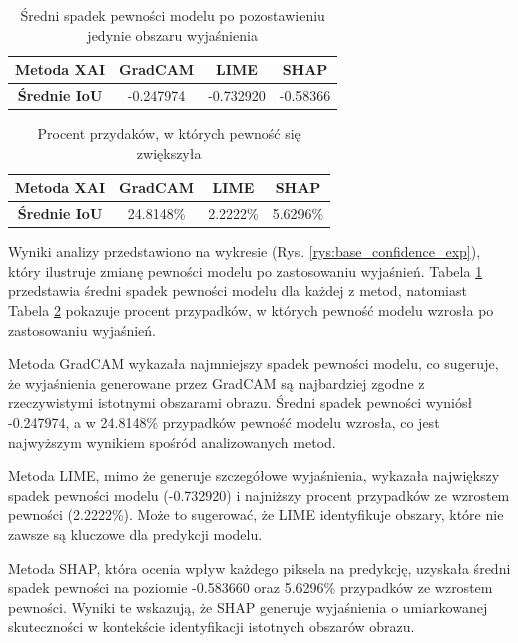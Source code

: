 \begin{table}
	\centering
	\begin{tabular}{|c|c|c|c|}
		\hline
		\textbf{Metoda XAI}  & GradCAM   & LIME      & SHAP     \\
		\hline
		\textbf{Średnie IoU} & -0.247974 & -0.732920 & -0.58366 \\
		\hline
	\end{tabular}
	\caption{Średni spadek pewności modelu po pozostawieniu jedynie obszaru wyjaśnienia}
	\label{tab:base_confidence_exp}
\end{table}

\begin{table}
	\centering
	\begin{tabular}{|c|c|c|c|}
		\hline
		\textbf{Metoda XAI}  & GradCAM   & LIME     & SHAP     \\
		\hline
		\textbf{Średnie IoU} & 24.8148\% & 2.2222\% & 5.6296\% \\
		\hline
	\end{tabular}
	\caption{Procent przydaków, w których pewność się zwiększyła}
	\label{tab:base_confidence_exp_percent}
\end{table}

Wyniki analizy przedstawiono na wykresie (Rys. \ref{rys:base_confidence_exp}), który ilustruje zmianę pewności modelu po zastosowaniu wyjaśnień.
Tabela \ref{tab:base_confidence_exp} przedstawia średni spadek pewności modelu dla każdej z metod, natomiast Tabela \ref{tab:base_confidence_exp_percent} pokazuje procent przypadków, w których pewność modelu wzrosła po zastosowaniu wyjaśnień.

Metoda GradCAM wykazała najmniejszy spadek pewności modelu, co sugeruje, że wyjaśnienia generowane przez GradCAM są najbardziej zgodne z rzeczywistymi istotnymi obszarami obrazu.
Średni spadek pewności wyniósł -0.247974, a w 24.8148\% przypadków pewność modelu wzrosła, co jest najwyższym wynikiem spośród analizowanych metod.

Metoda LIME, mimo że generuje szczegółowe wyjaśnienia, wykazała największy spadek pewności modelu (-0.732920) i najniższy procent przypadków ze wzrostem pewności (2.2222\%).
Może to sugerować, że LIME identyfikuje obszary, które nie zawsze są kluczowe dla predykcji modelu.

Metoda SHAP, która ocenia wpływ każdego piksela na predykcję, uzyskała średni spadek pewności na poziomie -0.583660 oraz 5.6296\% przypadków ze wzrostem pewności.
Wyniki te wskazują, że SHAP generuje wyjaśnienia o umiarkowanej skuteczności w kontekście identyfikacji istotnych obszarów obrazu.


